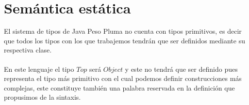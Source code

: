 \begin{definition}
\begin{description}
        \end{description}
    \end{definition}


\section{Semántica estática}
El sistema de tipos de \textsf{Java Peso Pluma} no cuenta con tipos primitivos, es decir que todos los tipos con los que trabajemos tendrán que ser definidos mediante su respectiva clase. \\\\
En este lenguaje el tipo $Top$ será $Object$ y este no tendrá que ser definido pues representa el tipo más primitivo con el cual podemos definir construcciones más complejas, este constituye también una palabra reservada en la definición que propusimos de la sintaxis. 

\bigskip

